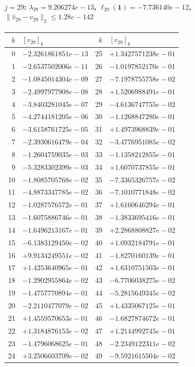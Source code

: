 \documentclass[11pt]{article}
\begin{document}
\paragraph{$j = 29$: $\lambda_{29} = 9.206274e-13$, \quad $\ell_{29}(\mathbf{1}) = -7.736140e-12$, \quad $\|\hat{v}_{29} - v_{29}\|_2 \leq 1.28e-142$}
\begin{center}
{\footnotesize
\begin{tabular}{r@{\;\;}l@{\quad}r@{\;\;}l}
\toprule
$k$ & $[v_{29}]_k$ & $k$ & $[v_{29}]_k$ \\
\midrule
0 & $-2.3261861851e-13$ & 25 & $+1.3427571238e-01$ \\
1 & $-2.6537502006e-11$ & 26 & $-1.0197852170e-01$ \\
2 & $-1.0845014304e-09$ & 27 & $-7.1978755758e-02$ \\
3 & $-2.4997977908e-08$ & 28 & $+1.5206988491e-01$ \\
4 & $-3.8403281045e-07$ & 29 & $-4.6136747755e-02$ \\
5 & $-4.2744181205e-06$ & 30 & $-1.1268847280e-01$ \\
6 & $-3.6158761725e-05$ & 31 & $+1.4973968839e-01$ \\
7 & $-2.3930616479e-04$ & 32 & $-3.4776951085e-02$ \\
8 & $-1.2604759035e-03$ & 33 & $-1.1358212855e-01$ \\
9 & $-5.3283302399e-03$ & 34 & $+1.6070737855e-01$ \\
10 & $-1.8085705768e-02$ & 35 & $-7.3365326757e-02$ \\
11 & $-4.8873347785e-02$ & 36 & $-7.1010771848e-02$ \\
12 & $-1.0287576572e-01$ & 37 & $+1.6160646294e-01$ \\
13 & $-1.6075886746e-01$ & 38 & $-1.3833695416e-01$ \\
14 & $-1.6496213167e-01$ & 39 & $+2.2868808827e-02$ \\
15 & $-6.1383129450e-02$ & 40 & $+1.0932184791e-01$ \\
16 & $+9.9134249551e-02$ & 41 & $-1.8270160139e-01$ \\
17 & $+1.4253640965e-01$ & 42 & $+1.6310751503e-01$ \\
18 & $-1.2902955864e-02$ & 43 & $-6.7706038275e-02$ \\
19 & $-1.4757770894e-01$ & 44 & $-5.2815649345e-02$ \\
20 & $-2.2110477079e-02$ & 45 & $+1.4335067125e-01$ \\
21 & $+1.4559570653e-01$ & 46 & $-1.6827874672e-01$ \\
22 & $+1.3184876153e-02$ & 47 & $+1.2144992745e-01$ \\
23 & $-1.4796068625e-01$ & 48 & $-2.2349122311e-02$ \\
24 & $+3.2506603709e-02$ & 49 & $-9.5921615504e-02$ \\
\bottomrule
\end{tabular}
}
\end{center}
\end{document}
